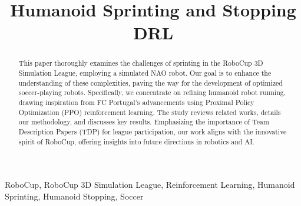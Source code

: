 \documentclass[conference]{IEEEtran}
\begin{document}
\title{Humanoid Sprinting and Stopping DRL}

\author{

    \and

    \and

}


\maketitle

\begin{abstract}

This paper thoroughly examines the challenges of sprinting in the RoboCup 3D Simulation League, employing a simulated NAO robot. Our goal is to enhance the understanding of these complexities, paving the way for the development of optimized soccer-playing robots. Specifically, we concentrate on refining humanoid robot running, drawing inspiration from FC Portugal's advancements using Proximal Policy Optimization (PPO) reinforcement learning. The study reviews related works, details our methodology, and discusses key results. Emphasizing the importance of Team Description Papers (TDP) for league participation, our work aligns with the innovative spirit of RoboCup, offering insights into future directions in robotics and AI.

\end{abstract}

\begin{IEEEkeywords}
    RoboCup, RoboCup 3D Simulation League, Reinforcement Learning, Humanoid Sprinting, Humanoid Stopping, Soccer
\end{IEEEkeywords}
\end{document}
